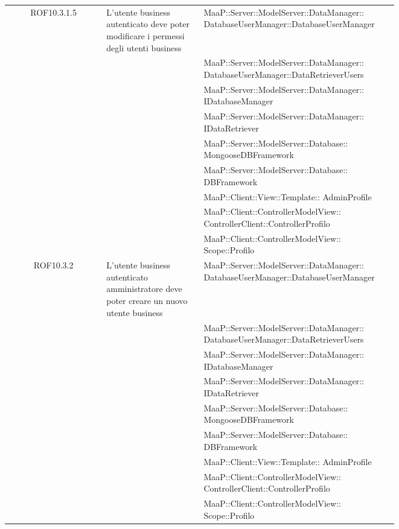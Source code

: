 \begin{center}
\begin{longtable}{|c|p{0.25\linewidth}|p{0.5\linewidth}|}
\midrule
ROF10.3.1.5
& L'utente business autenticato deve poter modificare i permessi degli utenti business
& MaaP::Server::ModelServer::DataManager:: DatabaseUserManager::DatabaseUserManager\\
& & MaaP::Server::ModelServer::DataManager:: DatabaseUserManager::DataRetrieverUsers\\
& & MaaP::Server::ModelServer::DataManager:: IDatabaseManager\\
& & MaaP::Server::ModelServer::DataManager:: IDataRetriever\\
& & MaaP::Server::ModelServer::Database:: MongooseDBFramework\\
& & MaaP::Server::ModelServer::Database:: DBFramework\\
& & MaaP::Client::View::Template:: AdminProfile\\
& & MaaP::Client::ControllerModelView:: ControllerClient::ControllerProfilo\\
& & MaaP::Client::ControllerModelView:: Scope::Profilo\\

\midrule
ROF10.3.2
& L'utente business autenticato amministratore deve poter creare un nuovo utente business
& MaaP::Server::ModelServer::DataManager:: DatabaseUserManager::DatabaseUserManager\\
& & MaaP::Server::ModelServer::DataManager:: DatabaseUserManager::DataRetrieverUsers\\
& & MaaP::Server::ModelServer::DataManager:: IDatabaseManager\\
& & MaaP::Server::ModelServer::DataManager:: IDataRetriever\\
& & MaaP::Server::ModelServer::Database:: MongooseDBFramework\\
& & MaaP::Server::ModelServer::Database:: DBFramework\\
& & MaaP::Client::View::Template:: AdminProfile\\
& & MaaP::Client::ControllerModelView:: ControllerClient::ControllerProfilo\\
& & MaaP::Client::ControllerModelView:: Scope::Profilo\\


\end{longtable}
\end{center}
